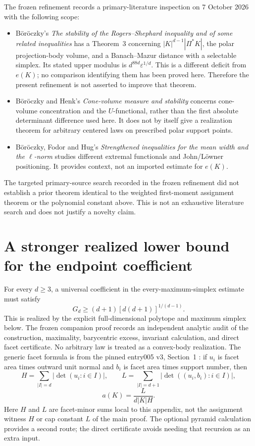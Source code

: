 \documentclass[11pt,letterpaper]{article}
\begin{document}
The frozen refinement records a primary-literature inspection on
7 October 2026 with the following scope:
\begin{itemize}
\item B\"or\"oczky's \emph{The stability of the Rogers--Shephard inequality
and of some related inequalities} \cite{boroczky} has a Theorem~3 concerning
$|K|^{d-1}|\Pi^*K|$, the polar projection-body volume, and a Banach--Mazur
distance with a selectable simplex. Its stated upper modulus is
$d^{88d}\varepsilon^{1/d}$. This is a different deficit from $e(K)$; no
comparison identifying them has been proved here. Therefore the present
refinement is not asserted to improve that theorem.
\item B\"or\"oczky and Henk's \emph{Cone-volume measure and stability}
\cite{bh} concerns cone-volume concentration and the $U$-functional,
rather than the first absolute determinant difference used here. It does
not by itself give a realization theorem for arbitrary centered laws on
prescribed polar support points.
\item B\"or\"oczky, Fodor and Hug's \emph{Strengthened inequalities for the
mean width and the $\ell$-norm} \cite{bfh} studies different extremal
functionals and John/L\"owner positioning. It provides context, not an
imported estimate for $e(K)$.
\end{itemize}
The targeted primary-source search recorded in the frozen refinement did
not establish a prior theorem identical to the weighted first-moment
assignment theorem or the polynomial constant above. This is not an
exhaustive literature search and does not justify a novelty claim.

\appendix
\section{A stronger realized lower bound for the endpoint coefficient}
\label{app:square}
For every $d\ge3$, a universal coefficient in the every-maximum-simplex
estimate must satisfy
\[
 G_d\ge(d+1)[d(d+1)]^{1/(d-1)}.
\]
This is realized by the explicit full-dimensional polytope and maximum
simplex below. The frozen companion proof records an independent analytic
audit of the construction, maximality, barycentric excess, invariant
calculation, and direct facet certificate. No arbitrary law is treated as
a convex-body realization. The generic facet formula is from the pinned
entry005 v3, Section~1 \cite{entry}: if $u_i$ is facet area times outward
unit normal and $b_i$ is facet area times support number, then
\[
 H=\sum_{|I|=d}|\det(u_i:i\in I)|,\qquad
 L=\sum_{|I|=d+1}|\det((u_i,b_i):i\in I)|,
\]
\[
 a(K)=\frac{L}{d|K|H}.
\]
Here $H$ and $L$ are facet-minor sums local to this appendix, not the
assignment witness $H$ or cap constant $L$ of the main proof. The optional
pyramid calculation provides a second route; the direct certificate avoids
needing that recursion as an extra input.
\end{document}
